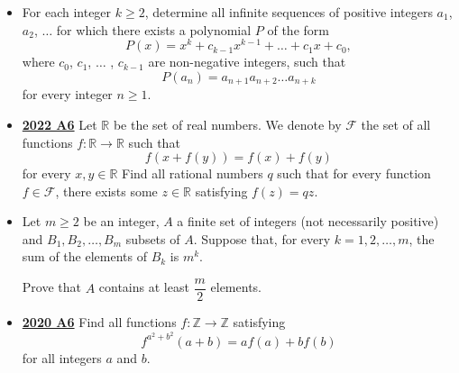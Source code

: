 \documentclass[11pt]{scrartcl}
\begin{document}
\begin{itemize}[leftmargin=*]
$$
b_n = 
\begin{cases}
A & \text{if } a_n = \frac{1}{2}(a_{n-1} + a_{n+1}) \\
G & \text{otherwise}.
\end{cases}
$$Prove that there exist positive integers $n_0$ and $d$ such that for all $n \geqslant  n_0$ we have $b_{n+d} = b_n$.
\item {} For each integer $k\geqslant  2$, determine all infinite sequences of positive integers $a_1$, $a_2$, $\dots$ for which there exists a polynomial $P$ of the form\[ P(x)=x^k+c_{k-1}x^{k-1}+\dots + c_1 x+c_0, \]where $c_0$, $c_1$, $\dots$ , $c_{k-1}$ are non-negative integers, such that\[ P(a_n)=a_{n+1}a_{n+2}\dots a_{n+k} \]for every integer $n\geqslant  1$.
    \item  \href{https://artofproblemsolving.com/community/c6h3107327p28104254}{\textbf{2022 A6}} Let $\mathbb R$ be the set of real numbers. We denote by $\mathcal F$ the set of all functions $f\colon\mathbb R\to\mathbb R$ such that
$$f(x + f(y)) = f(x) + f(y)$$for every $x,y\in\mathbb R$ Find all rational numbers $q$ such that for every function $f\in\mathcal F$, there exists some $z\in\mathbb R$ satisfying $f(z)=qz$.
\item {} Let $m\geqslant 2$ be an integer, $A$ a finite set of integers (not necessarily positive) and $B_1,B_2,\dots,B_m$ subsets of $A$. Suppose that, for every $k=1,2,\dots,m$, the sum of the elements of $B_k$ is $m^k$. 

Prove that $A$ contains at least $\dfrac{m}{2}$ elements.
\item \href{https://artofproblemsolving.com/community/c6h2625860p22698062}{\textbf{2020 A6}} Find all functions $f : \mathbb{Z}\rightarrow \mathbb{Z}$ satisfying
\[f^{a^{2} + b^{2}}(a+b) = af(a) +bf(b)\]for all integers $a$ and $b$.


\end{itemize}
\end{document}
